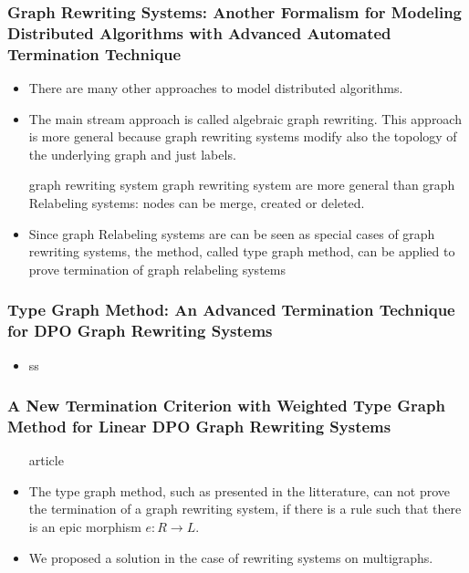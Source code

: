 \subsubsection*{Graph Rewriting Systems: Another Formalism for Modeling Distributed Algorithms with Advanced Automated Termination Technique}
\begin{itemize} 
    \item There are many other approaches to model distributed algorithms.
    \item The main stream approach is called algebraic graph rewriting. This approach is more general because graph rewriting systems modify also the topology of the underlying graph and just labels. 
    \item[graph rewriting system] graph rewriting system are more general than graph Relabeling systems: nodes can be merge, created or deleted.
    \item Since graph Relabeling systems are can be seen as special cases of graph rewriting systems, the method, called type graph method, can be applied to prove termination of graph relabeling systems
\end{itemize}



\subsubsection*{Type Graph Method: An Advanced Termination Technique for DPO Graph Rewriting Systems}

\begin{itemize}
    \item ss
\end{itemize}

\subsubsection*{A New Termination Criterion with Weighted Type Graph Method for Linear DPO Graph Rewriting Systems}
\begin{itemize}
    \item[article]
    \item The type graph method, such as presented in the litterature, can not prove the termination of a graph rewriting system, if there is a rule such that there is an epic morphism $e: R \mathop{\to} L$.
    \item We proposed a solution in the case of rewriting systems on multigraphs.
\end{itemize}

